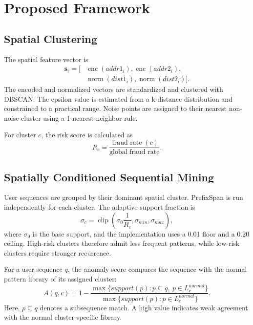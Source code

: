 \documentclass[conference]{IEEEtran}
\begin{document}
\section{Proposed Framework}
\subsection{Spatial Clustering}
The spatial feature vector is
\begin{equation}
\begin{aligned}
    \mathbf{s}_i = [&\operatorname{enc}(addr1_i),\operatorname{enc}(addr2_i),\\
    &\operatorname{norm}(dist1_i),\operatorname{norm}(dist2_i)].
\end{aligned}
\end{equation}
The encoded and normalized vectors are standardized and clustered with DBSCAN. The epsilon value is estimated from a k-distance distribution and constrained to a practical range. Noise points are assigned to their nearest non-noise cluster using a 1-nearest-neighbor rule.

For cluster $c$, the risk score is calculated as
\begin{equation}
    R_c = \frac{\operatorname{fraud\ rate}(c)}{\operatorname{global\ fraud\ rate}}.
\end{equation}

\subsection{Spatially Conditioned Sequential Mining}
User sequences are grouped by their dominant spatial cluster. PrefixSpan is run independently for each cluster. The adaptive support fraction is
\begin{equation}
    \sigma_c = \operatorname{clip}\left(\sigma_0 \frac{1}{R_c},
    \sigma_{min}, \sigma_{max}\right),
\end{equation}
where $\sigma_0$ is the base support, and the implementation uses a 0.01 floor and a 0.20 ceiling. High-risk clusters therefore admit less frequent patterns, while low-risk clusters require stronger recurrence.

For a user sequence $q$, the anomaly score compares the sequence with the normal pattern library of its assigned cluster:
\begin{equation}
    A(q,c) = 1 - \frac{\max\{support(p):p\subseteq q,\ p\in L^{normal}_c\}}
    {\max\{support(p):p\in L^{normal}_c\}}.
\end{equation}
Here, $p\subseteq q$ denotes a subsequence match. A high value indicates weak agreement with the normal cluster-specific library.
\end{document}

